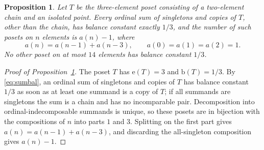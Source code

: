 \documentclass[10pt,a4paper]{amsart}
\newtheorem{proposition}{Proposition}
\newcommand{\bal}{\mathrm{b}}
\newcommand{\ext}{\mathrm{e}}
\begin{document}
\begin{proposition}\label{prop:equality}
Let $T$ be the three-element poset consisting of a two-element chain and an
isolated point.  Every ordinal sum of singletons and copies of $T$, other than
the chain, has balance constant exactly $1/3$, and the number of such posets
on $n$ elements is $a(n)-1$, where
\[
  a(n)=a(n-1)+a(n-3),\qquad a(0)=a(1)=a(2)=1.
\]
No other poset on at most $14$ elements has balance constant $1/3$.
\end{proposition}

\begin{proof}[Proof of Proposition~\ref{prop:equality}]
The poset $T$ has $\ext(T)=3$ and $\bal(T)=1/3$.  By \eqref{eq:sumbal}, an
ordinal sum of singletons and copies of $T$ has balance constant $1/3$ as soon
as at least one summand is a copy of $T$; if all summands are singletons the
sum is a chain and has no incomparable pair.  Decomposition into
ordinal-indecomposable summands is unique, so these posets are in bijection
with the compositions of $n$ into parts $1$ and $3$.  Splitting on the first
part gives $a(n)=a(n-1)+a(n-3)$, and discarding the all-singleton composition
gives $a(n)-1$.
\end{proof}
\end{document}
